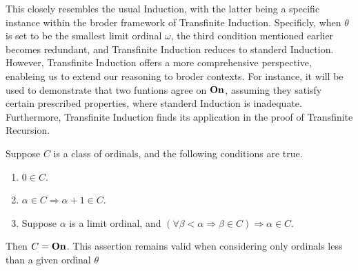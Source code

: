 
This closely resembles the usual Induction, with the latter being a specific instance within the broder framework of Transfinite Induction. Specificly, when $\theta$ is set to be the smallest limit ordinal $\omega$, the third condition mentioned earlier becomes redundant, and Transfinite Induction reduces to standerd Induction. However, Transfinite Induction offers a more comprehensive perspective, enableing us to extend our reasoning to broder contexts. For instance, it will be used to demonstrate that two funtions agree on $\boldsymbol{\mathrm{On}}$, assuming they satisfy certain prescribed properties, where standerd Induction is inadequate. Furthermore, Transfinite Induction finds its application in the proof of Transfinite Recursion.

\begin{theorem}
  Suppose $C$ is a class of ordinals, and the following conditions are true.
  \begin{enumerate}
    \item $0 \in C$.
    \item $\alpha \in C \Rightarrow \alpha + 1 \in C$.
    \item Suppose $\alpha$ is a limit ordinal, and $(\forall \beta < \alpha \Rightarrow \beta \in C) \Rightarrow \alpha \in C$.
  \end{enumerate}
  Then $C = \boldsymbol{\mathrm{On}}$. This assertion remains valid when considering only ordinals less than a given ordinal $\theta$
\end{theorem}

